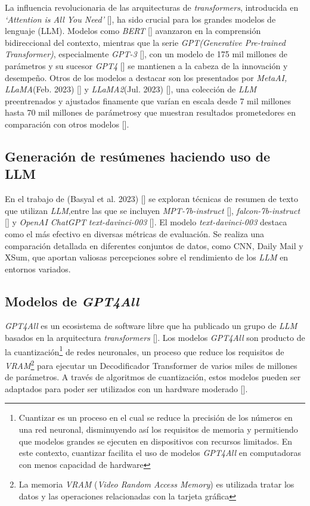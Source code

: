     La influencia revolucionaria de las arquitecturas de \emph{transformers}, introducida en \emph{`Attention is All You Need'}  [\cite{attention}], ha sido crucial para los grandes modelos de lenguaje (LLM). Modelos como \emph{BERT} [\cite{BERT}] avanzaron en la comprensión bidireccional del contexto, mientras que la serie \emph{GPT}\emph{(Generative Pre-trained Transformer)}, especialmente \emph{GPT-3} [\cite{brown2020language}], con un modelo de 175 mil millones de parámetros y su sucesor \emph{GPT4} [\cite{openai2023gpt4}] se mantienen a la cabeza de la innovación y desempeño. Otros de los modelos a destacar son los presentados por \emph{MetaAI, LLaMA}(Feb. 2023) [\cite{llamapaper}] y \emph{LLaMA2}(Jul. 2023) [\cite{llamapaper2}], una colección de \emph{LLM} preentrenados y ajustados finamente que varían en escala desde 7 mil millones hasta 70 mil millones de parámetrosy que muestran resultados prometedores en comparación con otros modelos [\cite{metallama}]. 
    
    \subsection{Generación de resúmenes haciendo uso de LLM}

    En el trabajo de (Basyal et al. 2023) [\cite{basyal2023text}] se exploran técnicas de resumen de texto que utilizan \emph{LLM},entre las que se incluyen \emph{MPT-7b-instruct} [\cite{mpt}], \emph{falcon-7b-instruct} [\cite{falcon}] y \emph{OpenAI ChatGPT} \emph{text-davinci-003} [\cite{brown2020language}]. El modelo \emph{text-davinci-003} destaca como el más efectivo en diversas métricas de evaluación. Se realiza una comparación detallada en diferentes conjuntos de datos, como CNN, Daily Mail y XSum, que aportan valiosas percepciones sobre el rendimiento de los \emph{LLM} en entornos variados. 

    \subsection{Modelos de \emph{GPT4All}}

        \emph{GPT4All} es un ecosistema de software libre que ha publicado un grupo de \emph{LLM} basados en la arquitectura \emph{transformers} [\cite{attention}]. Los modelos \emph{GPT4All} son producto de la cuantización\footnote{Cuantizar es un proceso en el cual se reduce la precisión de los números en una red neuronal, disminuyendo así los requisitos de memoria y permitiendo que modelos grandes se ejecuten en dispositivos con recursos limitados. En este contexto, cuantizar facilita el uso de modelos \emph{GPT4All} en computadoras con menos capacidad de hardware} de redes neuronales, un proceso que reduce los requisitos de \emph{VRAM}\footnote{La memoria \emph{VRAM} (\emph{Video Random Access Memory}) es utilizada tratar los datos y las operaciones relacionadas con la tarjeta gráfica} para ejecutar un Decodificador Transformer de varios miles de millones de parámetros. A través de algoritmos de cuantización, estos modelos pueden ser adaptados para poder ser utilizados con un hardware moderado [\cite{webgpt4all}].
        
